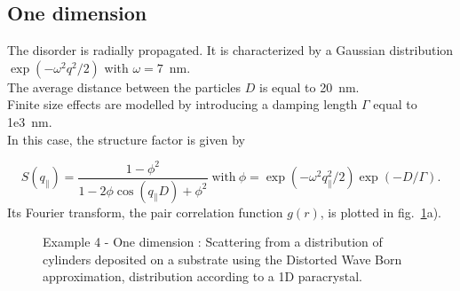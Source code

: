 \subsection{One dimension}
The disorder is radially propagated. It is characterized by a Gaussian distribution $\exp(-\omega^2q^2/2)$ with $\omega=7$~nm.\\ The average distance between the particles $D$ is equal to  20~nm.\\ Finite size effects are modelled by introducing a damping length $\Gamma$ equal to 1e3~nm.\\
In this case, the structure factor is given by

\begin{equation*}
S(q_{\parallel})= \frac{1-\phi^2 }{1-2\phi\cos(q_{\parallel} D)+\phi^2} \; \textrm{with} \ \phi=\exp(-\omega^2 q_{\parallel}^2/2)\exp(-D/\Gamma).
\end{equation*}
Its Fourier transform, the pair correlation function $g(r)$, is plotted in fig.~\ref{fig:PythonEx41DDL}a).


\begin{figure}[H]
\hfill
{}
\hfill
{}
\hfill
\caption{Example 4 - One dimension : Scattering from a distribution of cylinders deposited on a substrate using the Distorted Wave Born approximation, distribution according to a 1D paracrystal.}
\label{fig:PythonEx41DDL}
\end{figure}


